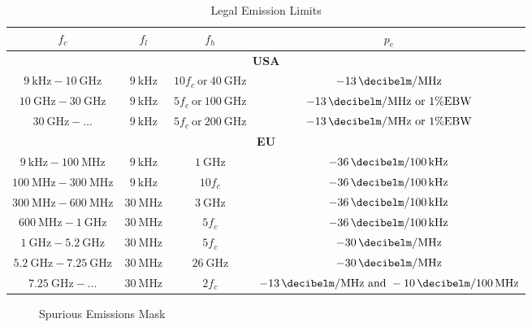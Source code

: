 \begin{table}
\centering
\caption{Legal Emission Limits}
\label{tab:legusa}
\begin{tabular}{|c|c|c|c|}
\hline
$f_c$  &  $f_l$ & $f_h$ & $p_e$ \\\hline
\multicolumn{4}{|c|}{\textbf{USA}} \\\hline
$\SI{9}{\kilo\hertz}-\SI{10}{\giga\hertz}$ & $\SI{9}{\kilo\hertz}$ & $10f_c\ \text{or}\ \SI{40}{\giga\hertz}$ & $\SI{-13}{\decibelm\per\mega\hertz}$ \\\hline
$\SI{10}{\giga\hertz}-\SI{30}{\giga\hertz}$ & $\SI{9}{\kilo\hertz}$ & $5f_c\ \text{or}\ \SI{100}{\giga\hertz}$ & $\SI{-13}{\decibelm\per\mega\hertz}\ \text{or}\ 1\% \text{EBW}$ \\\hline
$\SI{30}{\giga\hertz}-\dots$ & $\SI{9}{\kilo\hertz}$ & $5f_c\ \text{or}\ \SI{200}{\giga\hertz}$ & $\SI{-13}{\decibelm\per\mega\hertz}\ \text{or}\ 1\% \text{EBW}$ \\\hline
\multicolumn{4}{|c|}{\textbf{EU}} \\\hline
$\SI{9}{\kilo\hertz}-\SI{100}{\mega\hertz}$ & $\SI{9}{\kilo\hertz}$ & $\SI{1}{\giga\hertz}$ & $\SI{-36}{\decibelm\per \SI{100}{\kilo\hertz}}$ \\\hline
$\SI{100}{\mega\hertz}-\SI{300}{\mega\hertz}$ & $\SI{9}{\kilo\hertz}$ & $10f_c$ & $\SI{-36}{\decibelm\per \SI{100}{\kilo\hertz}}$ \\\hline
$\SI{300}{\mega\hertz}-\SI{600}{\mega\hertz}$ & $\SI{30}{\mega\hertz}$ & $\SI{3}{\giga\hertz}$ & $\SI{-36}{\decibelm\per \SI{100}{\kilo\hertz}}$ \\\hline
$\SI{600}{\mega\hertz}-\SI{1}{\giga\hertz}$ & $\SI{30}{\mega\hertz}$ & $5f_c$ & $\SI{-36}{\decibelm\per \SI{100}{\kilo\hertz}}$ \\\hline
$\SI{1}{\giga\hertz}-\SI{5.2}{\giga\hertz}$ & $\SI{30}{\mega\hertz}$ & $5f_c$ & $\SI{-30}{\decibelm\per\mega\hertz}$ \\\hline
$\SI{5.2}{\giga\hertz}-\SI{7.25}{\giga\hertz}$ & $\SI{30}{\mega\hertz}$ & $\SI{26}{\giga\hertz}$ & $\SI{-30}{\decibelm\per\mega\hertz}$ \\\hline
$\SI{7.25}{\giga\hertz}-\dots$ & $\SI{30}{\mega\hertz}$ & $2f_c$ & $\SI{-13}{\decibelm\per\mega\hertz}\ \text{and}\ \SI{-10}{\decibelm\per \SI{100}{\mega\hertz}}$ \\\hline
\end{tabular}
\end{table}

\begin{figure}
\centering
\def\svgwidth{0.9\textwidth}

\caption{Spurious Emissions Mask}
\label{fig:sem}
\end{figure}









